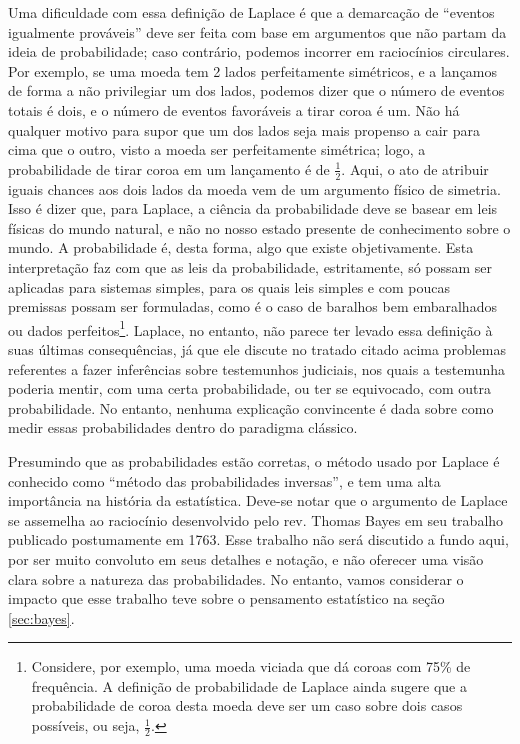 Uma dificuldade com essa definição de Laplace é que a demarcação de ``eventos igualmente prováveis'' deve ser feita
com base em argumentos que não partam da ideia de probabilidade; caso contrário, podemos incorrer em raciocínios
circulares. Por exemplo, se uma moeda tem 2 lados perfeitamente simétricos, e a lançamos de forma a não privilegiar um dos lados,
podemos dizer que o número de eventos totais é dois, e o número de eventos favoráveis a tirar coroa é um. Não há qualquer motivo
para supor que um dos lados seja mais propenso a cair para cima que o outro, visto a moeda ser perfeitamente simétrica; logo,
a probabilidade de tirar coroa em um lançamento é de $\frac{1}{2}$. Aqui, o ato de atribuir iguais chances aos dois
lados da moeda vem de um argumento físico de simetria. Isso é dizer que, para Laplace,
a ciência da probabilidade deve se basear em leis físicas do mundo natural, e não no nosso estado presente de conhecimento 
sobre o mundo. A probabilidade é, desta forma, algo que existe objetivamente.
Esta interpretação faz com que as leis da probabilidade, estritamente, só possam ser aplicadas para 
sistemas simples, para os quais leis simples e com poucas premissas possam ser formuladas,
como é o caso de baralhos bem embaralhados ou dados perfeitos\footnote{Considere, por exemplo, uma moeda
viciada que dá coroas com 75\% de frequência. A definição de probabilidade de Laplace ainda sugere que 
a probabilidade de coroa desta moeda deve ser um caso sobre dois casos possíveis, ou seja, $\frac{1}{2}$.}.
Laplace, no entanto, não parece ter levado essa 
definição à suas últimas consequências, já que ele discute no tratado citado acima problemas referentes a fazer inferências 
sobre testemunhos judiciais, nos 
quais a testemunha poderia mentir, com uma certa probabilidade, ou ter se equivocado, com outra probabilidade.
No entanto, 
nenhuma explicação convincente é dada sobre como medir essas probabilidades dentro do paradigma clássico.

Presumindo que as probabilidades estão corretas, o método usado por Laplace é conhecido como ``método das probabilidades
inversas'', e tem uma alta importância na história da estatística. 
Deve-se notar que o argumento de Laplace se assemelha ao raciocínio desenvolvido pelo rev. Thomas Bayes 
em seu trabalho publicado
postumamente em 1763. Esse trabalho não será discutido a fundo aqui, por ser muito convoluto em seus detalhes e notação,
e não oferecer uma visão clara sobre a natureza das probabilidades. No entanto, vamos considerar 
o impacto que esse trabalho
teve sobre o pensamento estatístico na seção \ref{sec:bayes}.

